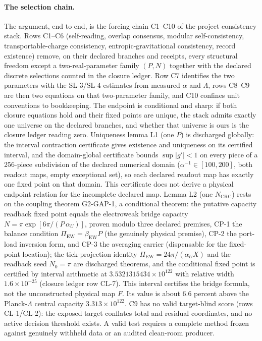 \documentclass[11pt]{article}
\begin{document}
\paragraph{The selection chain.}
The argument, end to end, is the forcing chain C1--C10 of the project consistency
stack. Rows C1--C6 (self-reading, overlap consensus, modular
self-consistency, transportable-charge consistency, entropic-gravitational consistency, record
existence) remove, on their declared branches and receipts, every structural freedom except a
two-real-parameter family \((P,N)\) together with the declared discrete selections counted in
the closure ledger. Row C7 identifies the two parameters with the SL-3/SL-4
estimates from measured \(\alpha\) and \(\Lambda\), rows C8--C9 are then two equations on that
two-parameter family, and C10 confines unit conventions to bookkeeping. The endpoint is
conditional and sharp: if both closure equations hold and their fixed points are unique, the stack
admits exactly one universe on the declared branches, and whether that universe is ours is the
closure ledger reading zero. Uniqueness lemma L1 (one \(P\)) is discharged globally: the interval
contraction certificate
gives existence and uniqueness on its certified interval, and the domain-global certificate
bounds \(\sup|g'|<1\) on every piece of a 256-piece subdivision of the declared numerical domain
(\(\alpha^{-1}\in[100,200]\), both readout maps, empty exceptional set), so each declared readout
map has exactly one fixed point on that domain. This certificate does not derive a physical
endpoint relation for the incomplete declared map. Lemma L2 (one
\(N_{\mathrm{CRC}}\)) rests on the coupling theorem G2-GAP-1, a conditional theorem: the
putative capacity readback fixed point equals the electroweak bridge capacity
\(N=\pi\exp[6\pi/(P\,\alpha_U)]\), proven modulo three declared premises, CP-1 the balance
condition \(\Pi_{\mathrm{EW}}=\beta_{\mathrm{EW}}P\) (the genuinely physical premise), CP-2 the
port-load inversion form, and CP-3 the averaging carrier (dispensable for the fixed-point
location); the tick-projection identity \(\Pi_{\mathrm{EW}}=24\pi/(\alpha_U X)\) and the readback
seed \(N_0=\pi\) are discharged theorems, and the conditional fixed point is certified by
interval arithmetic at \(3.5321315434\times10^{122}\) with relative width \(1.6\times10^{-25}\)
(closure ledger row CL-7). This interval certifies the bridge formula, not the unconstructed
physical map \(F\). Its value is about \(6.6\) percent above the Planck-\(\Lambda\) central
capacity \(3.313\times10^{122}\). C9 has no valid target-blind score
(rows CL-1/CL-2): the exposed target conflates total and residual coordinates, and no active
decision threshold exists. A valid test requires a complete method
frozen against genuinely withheld data or an audited clean-room producer.
\end{document}
